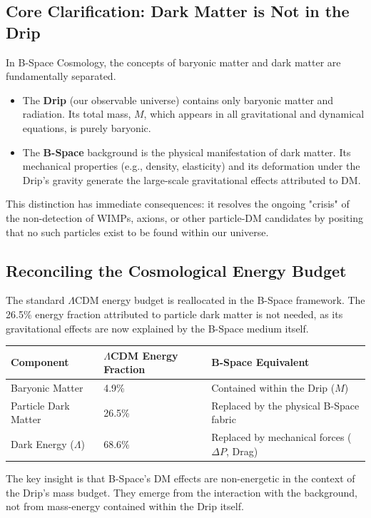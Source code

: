 \documentclass{BSpacePaper} %
\begin{document}
\begin{appendices}
\subsection{Core Clarification: Dark Matter is Not in the Drip}
In B-Space Cosmology, the concepts of baryonic matter and dark matter are fundamentally separated.
\begin{itemize}
    \item The \textbf{Drip} (our observable universe) contains only baryonic matter and radiation. Its total mass, $M$, which appears in all gravitational and dynamical equations, is purely baryonic.
    \item The \textbf{B-Space} background is the physical manifestation of dark matter. Its mechanical properties (e.g., density, elasticity) and its deformation under the Drip's gravity generate the large-scale gravitational effects attributed to DM.
\end{itemize}
This distinction has immediate consequences: it resolves the ongoing "crisis" of the non-detection of WIMPs, axions, or other particle-DM candidates by positing that no such particles exist to be found within our universe.

\subsection{Reconciling the Cosmological Energy Budget}
The standard \(\Lambda\)CDM energy budget is reallocated in the B-Space framework. The 26.5\% energy fraction attributed to particle dark matter is not needed, as its gravitational effects are now explained by the B-Space medium itself.

\begin{center}
    \captionsetup{type=table}
    \label{tab:reallocation}
    \begin{tabular}{@{}lll@{}}
    \toprule
    \textbf{Component} & \textbf{\(\Lambda\)CDM Energy Fraction} & \textbf{B-Space Equivalent} \\
    \midrule
    Baryonic Matter & 4.9\% & Contained within the Drip ($M$) \\
    \addlinespace
    Particle Dark Matter & 26.5\% & Replaced by the physical B-Space fabric \\
    \addlinespace
    Dark Energy (\(\Lambda\)) & 68.6\% & Replaced by mechanical forces ($\Delta P$, Drag) \\
    \bottomrule
    \end{tabular}
\end{center}
The key insight is that B-Space's DM effects are non-energetic in the context of the Drip's mass budget. They emerge from the interaction with the background, not from mass-energy contained within the Drip itself.


\end{appendices}
\end{document}
